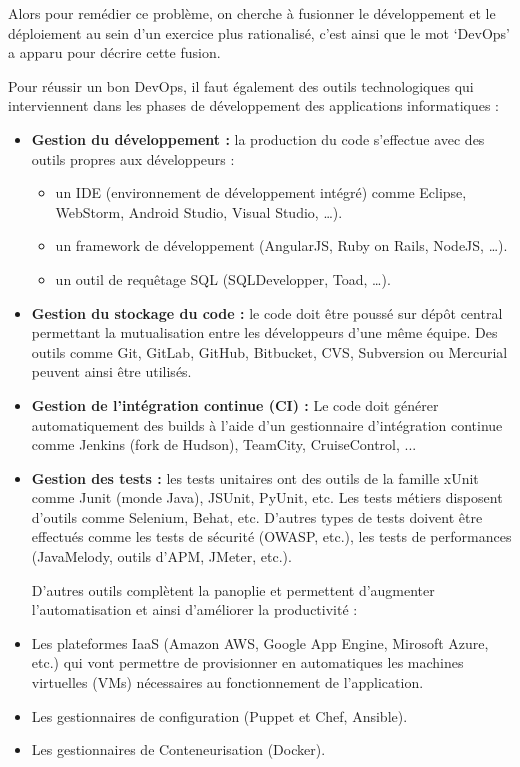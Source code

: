 \documentclass[a4paper,11pt,oneside]{report}
\begin{document}
Alors pour remédier ce problème, on cherche à fusionner le développement et le déploiement au sein d'un exercice plus rationalisé, c’est ainsi que le mot ‘DevOps’ a apparu pour décrire cette fusion.
\newline

Pour réussir un bon DevOps, il faut également des outils technologiques qui interviennent dans les phases de développement des applications informatiques :

\begin{itemize}
\item \textbf {Gestion du développement :} la production du code s’effectue avec des outils propres aux développeurs :
\begin{itemize}
\item un IDE (environnement de développement intégré) comme Eclipse, WebStorm, Android Studio, Visual Studio, …).
\item un framework de développement (AngularJS, Ruby on Rails,  NodeJS, …).
\item un outil de requêtage SQL (SQLDevelopper, Toad, …). 
\end{itemize}

\item \textbf {Gestion du stockage du code :} le code doit être poussé sur dépôt central permettant la mutualisation entre les développeurs d’une même équipe. Des outils comme Git, GitLab, GitHub, Bitbucket, CVS, Subversion ou Mercurial peuvent ainsi être utilisés.


\item \textbf {Gestion de l’intégration continue (CI) :} Le code doit générer automatiquement des builds à l’aide d’un gestionnaire d’intégration continue comme Jenkins\cite{jenkinsEssentials} (fork de Hudson), TeamCity, CruiseControl, ...


\item \textbf {Gestion des tests :} les tests unitaires ont des outils de la famille xUnit comme Junit (monde Java), JSUnit, PyUnit, etc. Les tests métiers disposent d’outils comme Selenium, Behat, etc. D’autres types de tests doivent être effectués comme les tests de sécurité (OWASP, etc.), les tests de performances (JavaMelody, outils d’APM, JMeter, etc.).
\newline

D’autres outils complètent la panoplie et permettent d’augmenter l’automatisation et ainsi d’améliorer la productivité :

\item Les plateformes IaaS (Amazon AWS, Google App Engine, Mirosoft Azure, etc.) qui vont permettre de provisionner en automatiques les machines virtuelles (VMs) nécessaires au fonctionnement de l’application.
\item Les gestionnaires de configuration (Puppet et Chef, Ansible).
\item Les gestionnaires de Conteneurisation (Docker\cite{proDocker}\cite{usingDocker}).
\end{itemize}
\end{document}
